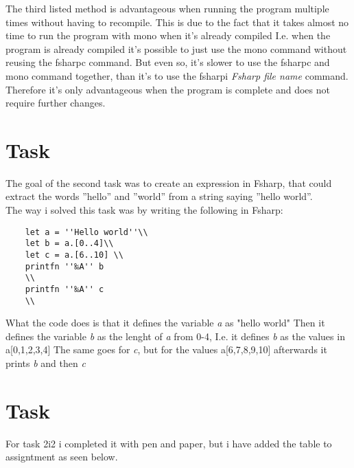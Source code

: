 \documentclass[a4paper]{article}
\begin{document}
    The third listed method is advantageous when running the program multiple times without having to recompile. This is due to 
    the fact that it takes almost no time to run the program with mono when it's already compiled I.e. when the program is 
    already compiled it's possible to just use the mono command without reusing the fsharpc command. But even so, it's slower
    to use the fsharpc and mono command together, than it's to use the fsharpi \emph{Fsharp file name} command. Therefore it's only
    advantageous when the program is complete and does not require further changes.
    
\newpage

    \section*{Task }

    The goal of the second task was to create an expression in Fsharp, that could extract the words ''hello'' and ''world'' 
    from a string saying ''hello world''.\\
    The way i solved this task was by writing the following in Fsharp:\\
\begin{verbatim}
    let a = ''Hello world''\\
    let b = a.[0..4]\\
    let c = a.[6..10] \\
    printfn ''‰A'' b
    \\
    printfn ''‰A'' c
    \\
\end{verbatim}
    What the code does is that it defines the variable \emph{a} as "hello world"
    Then it defines the variable \emph{b} as the lenght of \emph{a} from 0-4, I.e. it defines \emph{b} as the values in a[0,1,2,3,4]
    The same goes for \emph{c}, but for the values a[6,7,8,9,10]
    afterwards it prints \emph{b} and then \emph{c}
    \section*{Task }

    For task 2i2 i completed it with pen and paper, but i have added the table to assigntment as seen below.
\end{document}
